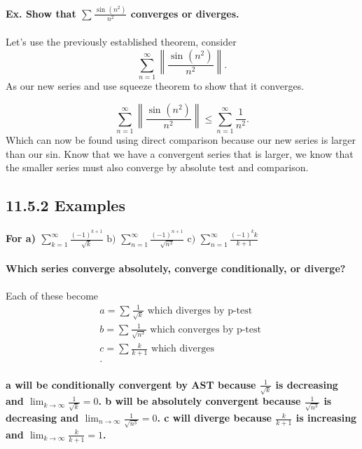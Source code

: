 \paragraph{Ex. Show that $ \sum_{  } ^{  } \frac{ \sin^{  } \left( n^2 \right)  }{ n^2 } $ converges or diverges.}
Let's use the previously established theorem, consider 
\[
\sum_{ n=1 } ^{ \infty } \left\| \frac{ \sin^{  } \left( n^2 \right)  }{ n^2 } \right\|
.\] As our new series and use squeeze theorem to show that it converges.

\[
\sum_{ n=1 } ^{ \infty } \left\| \frac{ \sin^{  } \left( n^2 \right)  }{ n^2 } \right\| \le \sum_{ n=1 } ^{ \infty } \frac{ 1 }{ n^2 } 
.\] 
Which can now be found using direct comparison because our new series is larger than our sin. Know that we have a convergent series that is larger, we know that the smaller series must also converge by absolute test and comparison. 
\subsection*{11.5.2 Examples}%
\label{sub:11.5.2 Examples}

\paragraph{For a) $ \sum_{ k=1 } ^{ \infty } \frac{ \left( -1 \right) ^{ k+1 } }{ \sqrt{ k} } \text{ b)  }\sum_{ n=1 } ^{ \infty } \frac{ \left( -1 \right) ^{ n+1 } }{ \sqrt{ n^3} } \text{ c)  } \sum_{ n=1 } ^{ \infty } \frac{ \left( -1 \right) ^{ k }k }{ k+1 } $ }
\paragraph{Which series converge absolutely, converge conditionally, or diverge?}
Each of these become
\begin{align*}
a = \sum_{  } ^{  } \frac{ 1 }{ \sqrt{ k} } \text{ which diverges by p-test } \\
b = \sum_{  } ^{  } \frac{ 1 }{ \sqrt{ n^3} } \text{ which converges by p-test } \\
c = \sum_{  } ^{  } \frac{ k }{ k+1 } \text{ which diverges } \\
.\end{align*}
\paragraph{a will be conditionally convergent by AST because $ \frac{ 1 }{ \sqrt{ k} } $ is decreasing and $ \lim_{ k \to \infty } \frac{ 1 }{ \sqrt{ k} } = 0 $. b will be absolutely convergent because $ \frac{ 1 }{ \sqrt{ n^3} } $ is decreasing and $ \lim_{ n \to \infty } \frac{ 1 }{ \sqrt{ n^3} } = 0 $. c will diverge because $ \frac{ k }{ k+1 } $ is increasing and $ \lim_{ k \to \infty } \frac{ k }{ k+1 } = 1 $.}

